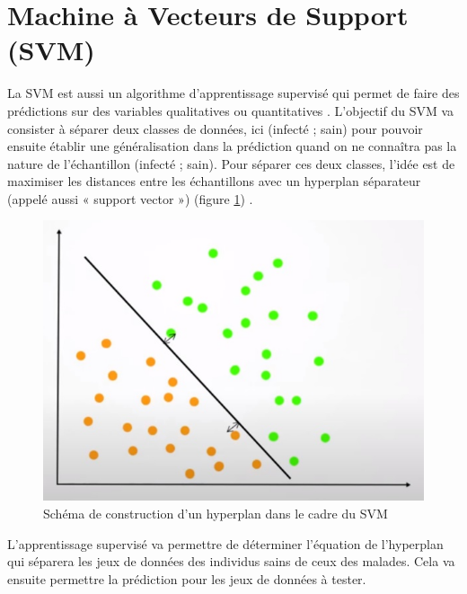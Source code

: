 \documentclass[
  11pt,
  french,
  a4paper,
  extrafontsizes,onecolumn,openright
  ]{memoir}
\begin{document}
\normalsize

\vfill
\newpage

\hypertarget{machine-uxe0-vecteurs-de-support-svm}{%
\section{Machine à Vecteurs de Support (SVM)}\label{machine-uxe0-vecteurs-de-support-svm}}

La SVM est aussi un algorithme d'apprentissage supervisé qui permet de faire des prédictions sur des variables qualitatives ou quantitatives \autocite{e1071}. L'objectif du SVM va consister à séparer deux classes de données, ici (infecté ; sain) pour pouvoir ensuite établir une généralisation dans la prédiction quand on ne connaîtra pas la nature de l'échantillon (infecté ; sain). Pour séparer ces deux classes, l'idée est de maximiser les distances entre les échantillons avec un hyperplan séparateur (appelé aussi « support vector ») (figure \ref{fig:14}) \autocite{cortes_support-vector_1995}.

\scriptsize

\begin{figure}

{\centering \includegraphics[width=0.8\linewidth]{Images/Figure14} 

}

\caption{Schéma de construction d’un hyperplan dans le cadre du SVM}\label{fig:14}
\end{figure}

\normalsize

L'apprentissage supervisé va permettre de déterminer l'équation de l'hyperplan qui séparera les jeux de données des individus sains de ceux des malades. Cela va ensuite permettre la prédiction pour les jeux de données à tester.
\end{document}
